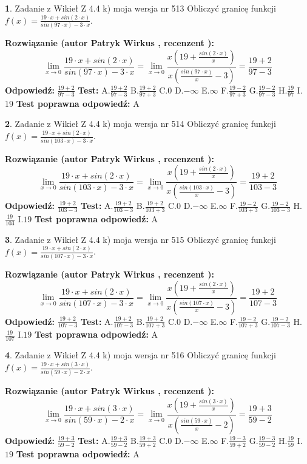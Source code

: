 \documentclass[12pt, a4paper]{article}
\theoremstyle{definition} %
\newtheorem{zad}{}
\newcommand{\zadStart}[1]{\begin{zad}#1\newline}
\newcommand{\zadStop}{\end{zad}}
\newcommand{\rozwStart}[2]{\noindent \textbf{Rozwiązanie (autor #1 , recenzent #2): }\newline}
\newcommand{\rozwStop}{\newline}
\newcommand{\odpStart}{\noindent \textbf{Odpowiedź:}\newline}
\newcommand{\odpStop}{\newline}
\newcommand{\testStart}{\noindent \textbf{Test:}\newline}
\newcommand{\testStop}{\newline}
\newcommand{\kluczStart}{\noindent \textbf{Test poprawna odpowiedź:}\newline}
\newcommand{\kluczStop}{\newline}
\begin{document}
\zadStart{Zadanie z Wikieł Z 4.4 k) moja wersja nr 513}
Obliczyć granicę funkcji $f(x)=\frac{19\cdot x +sin(2\cdot x)}{sin(97\cdot x) -3\cdot x}$.
\zadStop
\rozwStart{Patryk Wirkus}{}
$$\lim\limits_{x\to 0}\frac{19\cdot x +sin(2\cdot x)}{sin(97\cdot x) -3\cdot x}
=\lim\limits_{x\to 0}\frac{x(19+\frac{sin(2\cdot x)}{x})}{x(\frac{sin(97\cdot x)}{x}-3)}
=\frac{19+2}{97-3}$$
\rozwStop
\odpStart
$\frac{19+2}{97-3}$
\odpStop
\testStart
A.$\frac{19+2}{97-3}$
B.$\frac{19+2}{97+3}$
C.$0$
D.$-\infty$
E.$\infty$
F.$\frac{19-2}{97+3}$
G.$\frac{19-2}{97-3}$
H.$\frac{19}{97}$
I.$19$
\testStop
\kluczStart
A
\kluczStop



\zadStart{Zadanie z Wikieł Z 4.4 k) moja wersja nr 514}
Obliczyć granicę funkcji $f(x)=\frac{19\cdot x +sin(2\cdot x)}{sin(103\cdot x) -3\cdot x}$.
\zadStop
\rozwStart{Patryk Wirkus}{}
$$\lim\limits_{x\to 0}\frac{19\cdot x +sin(2\cdot x)}{sin(103\cdot x) -3\cdot x}
=\lim\limits_{x\to 0}\frac{x(19+\frac{sin(2\cdot x)}{x})}{x(\frac{sin(103\cdot x)}{x}-3)}
=\frac{19+2}{103-3}$$
\rozwStop
\odpStart
$\frac{19+2}{103-3}$
\odpStop
\testStart
A.$\frac{19+2}{103-3}$
B.$\frac{19+2}{103+3}$
C.$0$
D.$-\infty$
E.$\infty$
F.$\frac{19-2}{103+3}$
G.$\frac{19-2}{103-3}$
H.$\frac{19}{103}$
I.$19$
\testStop
\kluczStart
A
\kluczStop



\zadStart{Zadanie z Wikieł Z 4.4 k) moja wersja nr 515}
Obliczyć granicę funkcji $f(x)=\frac{19\cdot x +sin(2\cdot x)}{sin(107\cdot x) -3\cdot x}$.
\zadStop
\rozwStart{Patryk Wirkus}{}
$$\lim\limits_{x\to 0}\frac{19\cdot x +sin(2\cdot x)}{sin(107\cdot x) -3\cdot x}
=\lim\limits_{x\to 0}\frac{x(19+\frac{sin(2\cdot x)}{x})}{x(\frac{sin(107\cdot x)}{x}-3)}
=\frac{19+2}{107-3}$$
\rozwStop
\odpStart
$\frac{19+2}{107-3}$
\odpStop
\testStart
A.$\frac{19+2}{107-3}$
B.$\frac{19+2}{107+3}$
C.$0$
D.$-\infty$
E.$\infty$
F.$\frac{19-2}{107+3}$
G.$\frac{19-2}{107-3}$
H.$\frac{19}{107}$
I.$19$
\testStop
\kluczStart
A
\kluczStop



\zadStart{Zadanie z Wikieł Z 4.4 k) moja wersja nr 516}
Obliczyć granicę funkcji $f(x)=\frac{19\cdot x +sin(3\cdot x)}{sin(59\cdot x) -2\cdot x}$.
\zadStop
\rozwStart{Patryk Wirkus}{}
$$\lim\limits_{x\to 0}\frac{19\cdot x +sin(3\cdot x)}{sin(59\cdot x) -2\cdot x}
=\lim\limits_{x\to 0}\frac{x(19+\frac{sin(3\cdot x)}{x})}{x(\frac{sin(59\cdot x)}{x}-2)}
=\frac{19+3}{59-2}$$
\rozwStop
\odpStart
$\frac{19+3}{59-2}$
\odpStop
\testStart
A.$\frac{19+3}{59-2}$
B.$\frac{19+3}{59+2}$
C.$0$
D.$-\infty$
E.$\infty$
F.$\frac{19-3}{59+2}$
G.$\frac{19-3}{59-2}$
H.$\frac{19}{59}$
I.$19$
\testStop
\kluczStart
A
\kluczStop
\end{document}
